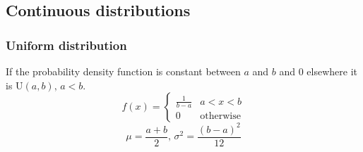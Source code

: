 \subsection{Continuous distributions}

\subsubsection{Uniform distribution}
If the probability density function is constant between $a$ and $b$ and 0 elsewhere it is $\textrm{U}(a,b),\,a<b$.
\[f(x) = \left\{
\begin{array}{cl}
\frac{1}{b-a} & a<x<b\\
0 & \textrm{otherwise}
\end{array}\right.\]
\[\mu=\frac{a+b}{2},\,\sigma^2=\frac{(b-a)^2}{12}\]
